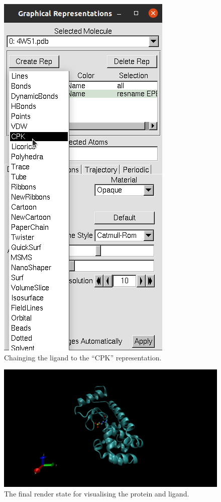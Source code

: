     \begin{figure}[H]
        \centering
        \includegraphics[height=0.4\textheight]{Graphics/ScreenShots/CPK.png}
        \caption{Chainging the ligand to the \enquote{CPK} representation.}
        \label{fig:CPK}
    \end{figure}

    \begin{figure}[H]
        \centering
        \includegraphics[width=.9\textwidth]{Graphics/ScreenShots/CartoonRender.png}
        \caption{The final render state for visualising the protein and ligand.}
        \label{fig:FinalRender}
    \end{figure}

